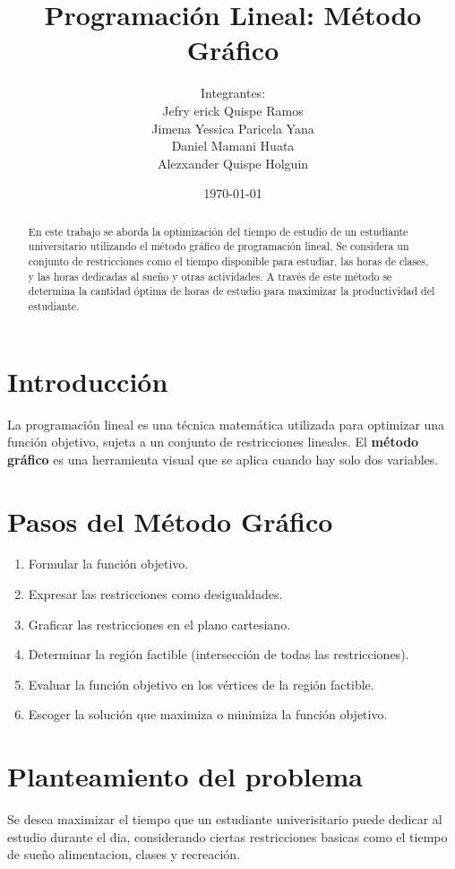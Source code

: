 \documentclass[12pt]{article}
\title{Programación Lineal: Método Gráfico}
\author{Integrantes: \\Jefry erick Quispe Ramos\\ Jimena Yessica Paricela Yana\\ Daniel Mamani Huata\\ Alezxander Quispe Holguin }
\date{\today}
\begin{document}
\maketitle

\begin{abstract}
    En este trabajo se aborda la optimización del tiempo de estudio de un estudiante universitario utilizando el método gráfico de programación lineal. Se considera un conjunto de restricciones como el tiempo disponible para estudiar, las horas de clases, y las horas dedicadas al sueño y otras actividades. A través de este método se determina la cantidad óptima de horas de estudio para maximizar la productividad del estudiante.
\end{abstract}

\section*{Introducción}

La programación lineal es una técnica matemática utilizada para optimizar una función objetivo, sujeta a un conjunto de restricciones lineales. El \textbf{método gráfico} es una herramienta visual que se aplica cuando hay solo dos variables.

\section*{Pasos del Método Gráfico}

\begin{enumerate}
    \item Formular la función objetivo.
    \item Expresar las restricciones como desigualdades.
    \item Graficar las restricciones en el plano cartesiano.
    \item Determinar la región factible (intersección de todas las restricciones).
    \item Evaluar la función objetivo en los vértices de la región factible.
    \item Escoger la solución que maximiza o minimiza la función objetivo.
\end{enumerate}

\section*{Planteamiento del problema}
Se desea maximizar el tiempo que un estudiante univerisitario puede dedicar al estudio durante el dia, considerando ciertas restricciones basicas como el tiempo de sueño alimentacion, clases y recreación.
\end{document}
